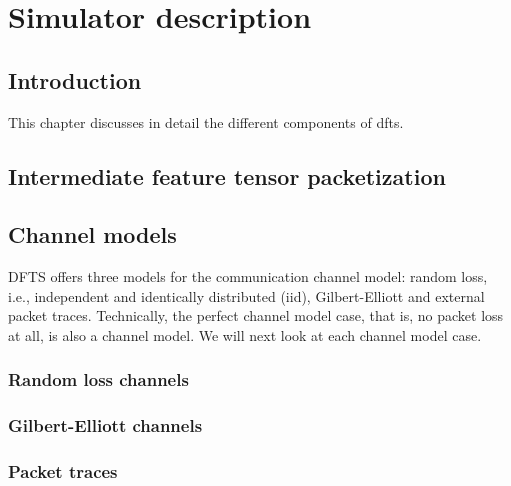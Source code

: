 \chapter{Simulator description}\label{chapt:simdescr}
\section{Introduction}
This chapter discusses in detail the different components of \gls{dfts}.

\section{Intermediate feature tensor packetization} \label{sec:simdescr:pkt}


\section{Channel models} \label{sec:simdescr:channel}
DFTS offers three models for the communication channel model: random loss, i.e., independent and identically distributed (iid), Gilbert-Elliott and external packet traces. Technically, the perfect channel model case, that is, no packet loss at all, is also a channel model. We will next look at each channel model case.

\subsection{Random loss channels}

\subsection{Gilbert-Elliott channels}

\subsection{Packet traces}

